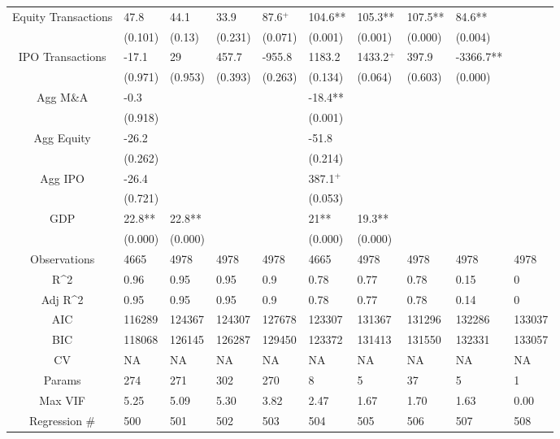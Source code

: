 \documentclass{article}
\begin{document}
\begin{table}[H]
\begin{tabular}{|clllllllll|}
  Equity Transactions & 47.8 & 44.1 & 33.9 & 87.6$^{+}$ & 104.6** & 105.3** & 107.5** & 84.6** &  \\ 
   & (0.101) & (0.13) & (0.231) & (0.071) & (0.001) & (0.001) & (0.000) & (0.004) &  \\ 
  IPO Transactions & -17.1 & 29 & 457.7 & -955.8 & 1183.2 & 1433.2$^{+}$ & 397.9 & -3366.7** &  \\ 
   & (0.971) & (0.953) & (0.393) & (0.263) & (0.134) & (0.064) & (0.603) & (0.000) &  \\ 
  Agg M\&A & -0.3 &  &  &  & -18.4** &  &  &  &  \\ 
   & (0.918) &  &  &  & (0.001) &  &  &  &  \\ 
  Agg Equity & -26.2 &  &  &  & -51.8 &  &  &  &  \\ 
   & (0.262) &  &  &  & (0.214) &  &  &  &  \\ 
  Agg IPO & -26.4 &  &  &  & 387.1$^{+}$ &  &  &  &  \\ 
   & (0.721) &  &  &  & (0.053) &  &  &  &  \\ 
  GDP & 22.8** & 22.8** &  &  & 21** & 19.3** &  &  &  \\ 
   & (0.000) & (0.000) &  &  & (0.000) & (0.000) &  &  &  \\ 
  \hline 
 Observations & 4665 & 4978 & 4978 & 4978 & 4665 & 4978 & 4978 & 4978 & 4978 \\ 
  R^2 & 0.96 & 0.95 & 0.95 & 0.9 & 0.78 & 0.77 & 0.78 & 0.15 & 0 \\ 
  Adj R^2 & 0.95 & 0.95 & 0.95 & 0.9 & 0.78 & 0.77 & 0.78 & 0.14 & 0 \\ 
  AIC & 116289 & 124367 & 124307 & 127678 & 123307 & 131367 & 131296 & 132286 & 133037 \\ 
  BIC & 118068 & 126145 & 126287 & 129450 & 123372 & 131413 & 131550 & 132331 & 133057 \\ 
  CV & NA & NA & NA & NA & NA & NA & NA & NA & NA \\ 
  Params & 274 & 271 & 302 & 270 & 8 & 5 & 37 & 5 & 1 \\ 
  Max VIF & 5.25 & 5.09 & 5.30 & 3.82 & 2.47 & 1.67 & 1.70 & 1.63 & 0.00 \\ 
  Regression \# & 500 & 501 & 502 & 503 & 504 & 505 & 506 & 507 & 508 \\ 
   \hline
\end{tabular}
 
\end{table}
\end{document}
